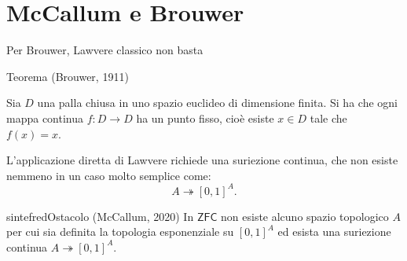 \documentclass[italian,usepdftitle=false]{beamer}
\begin{document}
\section{McCallum e Brouwer}

\begin{frame}{Per Brouwer, Lawvere classico non basta}
  \small
  \begin{block}{Teorema (Brouwer, 1911)}
    \raggedright
    Sia $D$ una palla chiusa in uno spazio euclideo di dimensione finita. Si ha che ogni mappa continua $f:D\to D$ ha un punto fisso, cioè esiste $x\in D$ tale che $f(x)=x$.
  \end{block}

  \vspace{0mm}
  \raggedright
  L'applicazione diretta di Lawvere richiede una suriezione continua, che non esiste nemmeno in un caso molto semplice come:
  {\setlength{\abovedisplayskip}{2pt}
  \setlength{\abovedisplayshortskip}{2pt}
  \setlength{\belowdisplayskip}{2pt}
  \setlength{\belowdisplayshortskip}{2pt}
  \[
    A\twoheadrightarrow[0,1]^A.
  \]}
  \vspace{-3mm}
  \begin{colorblock}[white]{sintefred}{Ostacolo (McCallum, 2020)}
    In $\mathsf{ZFC}$ non esiste alcuno spazio topologico $A$ per cui sia
    definita la topologia esponenziale su $[0,1]^A$ ed esista una suriezione continua $A\twoheadrightarrow[0,1]^A$.
  \end{colorblock}

  \vspace{2mm}
  {\centering
  \par}
\end{frame}
\end{document}
